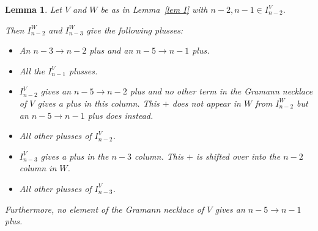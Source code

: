 \documentclass[11pt]{article}
\newtheorem{lem}[thm]{Lemma}
\theoremstyle{remark}
\theoremstyle{definition}
\begin{document}
\begin{lem}\label{lem n-2 bad}
  Let $V$ and $W$ be as in Lemma~\ref{lem I} with $n-2,n-1 \in I_{n-2}^{V}$.

  Then $I_{n-2}^{W}$ and $I_{n-3}^{W}$ give the following plusses:
  \begin{itemize}
  \item An $n-3\rightarrow n-2$ plus and an $n-5\rightarrow n-1$ plus.
  \item All the $I_{n-1}^{V}$ plusses.
  \item $I_{n-2}^{V}$ gives an $n-5\rightarrow n-2$ plus and no other term in the Gramann necklace of $V$ gives a plus in this column.  This $+$ does not appear in $W$ from $I_{n-2}^{W}$ but an $n-5\rightarrow n-1$ plus does instead.
  \item All other plusses of $I_{n-2}^{V}$.
  \item $I_{n-3}^{V}$ gives a plus in the $n-3$ column.  This $+$ is shifted over into the $n-2$ column in $W$.
  \item All other plusses of $I_{n-3}^{V}$.
  \end{itemize}
  Furthermore, no element of the Gramann necklace of $V$ gives an $n-5\rightarrow n-1$ plus.
\end{lem}
\end{document}
